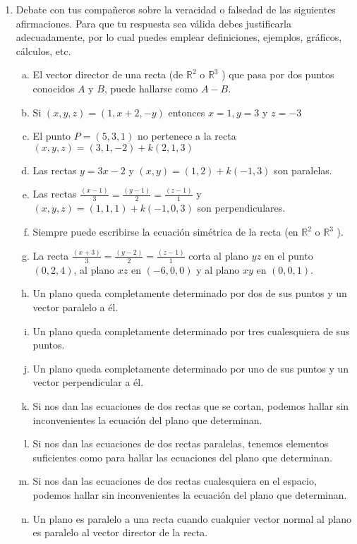 \documentclass[11pt,a4paper]{article}
\begin{document}
\begin{enumerate}
\item Debate con tus compa\~neros sobre la veracidad o falsedad de las si\-guien\-tes afirmaciones. Para que tu respuesta sea v\'alida debes justificarla adecuadamente, por lo cual puedes emplear definiciones, ejemplos, gr\'aficos, c\'alculos, etc.

\begin{enumerate}[a)]
\item El vector director de una recta (de $\mathbb{R}^{2}$ o $\mathbb{R}^{3}$ ) que pasa por dos puntos conocidos $A$ y $B$, puede hallarse como $A-B$.
\item Si $(x, y, z) = (1, x + 2, -y)$ entonces $x = 1, y = 3$ y $z = -3$
\item El punto $P = (5, 3, 1)$ no pertenece a la recta \linebreak $(x, y, z) = (3, 1,-2) + k (2, 1, 3)$
\item Las rectas $y = 3x - 2$ y $(x, y) = (1, 2) + k (-1, 3)$ son paralelas.
\item Las rectas $\frac{(x - 1)}{3} = \frac{(y - 1)}{2} = \frac{(z - 1)}{1}$ y $(x, y, z) = (1, 1, 1) + k (-1, 0, 3)$ son perpendiculares.
\item Siempre puede escribirse la ecuación sim\'etrica de la recta (en $\mathbb{R}^{2}$ o $\mathbb{R}^{3}$ ).
\item La recta $\frac{(x + 3)}{3} = \frac{(y - 2)}{2} = \frac{(z - 1)}{1}$ corta al plano $yz$ en el punto $(0, 2, 4)$, al plano $xz$ en $(-6, 0, 0)$ y al plano $xy$ en $(0, 0,1)$.
\item Un plano queda completamente determinado por dos de sus puntos y un vector paralelo a \'el.
\item Un plano queda completamente determinado por tres cualesquiera de sus puntos.
\item Un plano queda completamente determinado por uno de sus puntos y un vector perpendicular a \'el.
\item Si nos dan las ecuaciones de dos rectas que se cortan, podemos hallar sin inconvenientes la ecuaci\'on del plano que determinan.
\item Si nos dan las ecuaciones de dos rectas paralelas, tenemos elementos suficientes como para hallar las ecuaciones del plano que determinan.
\item Si nos dan las ecuaciones de dos rectas cualesquiera en el espacio, podemos hallar sin inconvenientes la ecuaci\'on del plano que determinan.
\item Un plano es paralelo a una recta cuando cualquier vector normal al plano es paralelo al vector director de la recta.

\end{enumerate}
\end{enumerate}
\end{document}
